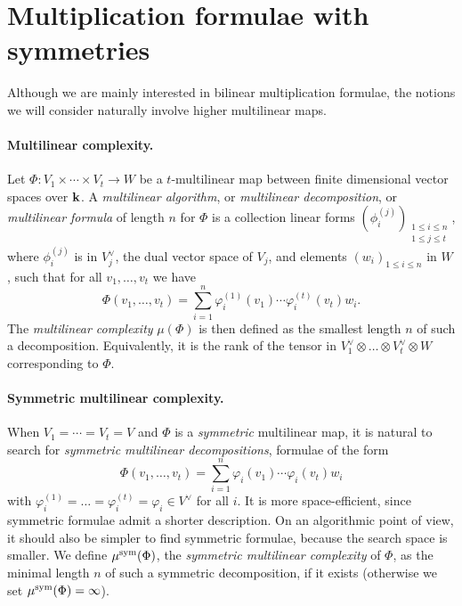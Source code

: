 \documentclass[11pt]{article}
\begin{document}
\section{Multiplication formulae with symmetries}
\label{sec:symtrisym}

Although we are mainly interested in bilinear multiplication formulae,
the notions we will consider naturally involve higher multilinear maps.

\paragraph{Multilinear complexity.}
Let $\Phi:V_1\times\cdots\times V_t\to W$
be a $t$-multilinear map between finite dimensional vector spaces over $\mathbf{k}$.
A \emph{multilinear algorithm}, or \emph{multilinear decomposition}, or \emph{multilinear formula} of length $n$ for $\Phi$ is a collection linear
forms $(\phi_i^{(j)})_{\substack{1\leq i \leq n\\1\leq j\leq t}}$,
where $\phi_i^{(j)}$ is in $V_j^\vee$, the dual vector space of $V_j$,
and elements $(w_i)_{1\leq i \leq n}$ in $W$, 
such that for all $v_1,\dots,v_t$ we have
\[
  \Phi(v_1,\dots,v_t)=\sum_{i=1}^{n}\varphi_i^{(1)}(v_1)\cdots\varphi_i^{(t)}(v_t)w_i.
\]
The \emph{multilinear complexity} $\mu(\Phi)$ is then defined as the smallest
length $n$ of such a decomposition.
Equivalently, it is the rank of the tensor in
$V_1^\vee \otimes\dots\otimes V_t^\vee\otimes W$
corresponding to $\Phi$.

\paragraph{Symmetric multilinear complexity.}
When $V_1=\cdots=V_t=V$ and $\Phi$ is a \emph{symmetric} multilinear map, it is
natural to search for \emph{symmetric multilinear decompositions}, \ie formulae of the form
\begin{equation*}
  \Phi(v_1,\dots,v_t)=\sum_{i=1}^{n}\varphi_i(v_1)\cdots\varphi_i(v_t)w_i
\end{equation*}
with $\varphi_i^{(1)}=\dots=\varphi_i^{(t)}=\varphi_i\in V^\vee$ for all $i$.
It is more space-efficient, since symmetric formulae admit a shorter description.
On an algorithmic point of view, it should also be simpler to find symmetric formulae,
because the search space is smaller. 
We define $\mu^{\textrm{sym}}(\Phi)$,
the \emph{symmetric multilinear complexity} of $\Phi$,
as the minimal length $n$ of such a symmetric decomposition, if it exists
(otherwise we set $\mu^{\textrm{sym}}(\Phi)=\infty$).
\end{document}
